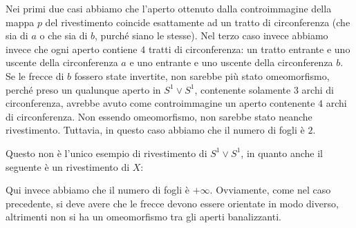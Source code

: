 \documentclass[11pt, a4paper, twoside]{article}
\begin{document}
\begin{es}[$X=S^1 \vee S^1$]
\begin{itemize}
	\end{itemize}
	Nei primi due casi abbiamo che l'aperto ottenuto dalla controimmagine della mappa $p$ del rivestimento coincide esattamente ad un tratto di circonferenza (che sia di $a$ o che sia di $b$, purché siano le stesse). Nel terzo caso invece abbiamo invece che ogni aperto contiene $4$ tratti di circonferenza: un tratto entrante e uno uscente della circonferenza $a$ e uno entrante e uno uscente della circonferenza $b$. Se le frecce di $b$ fossero state invertite, non sarebbe più stato omeomorfismo, perché preso un qualunque aperto in $S^1\vee S^1$, contenente solamente $3$ archi di circonferenza, avrebbe avuto come controimmagine un aperto contenente $4$ archi di circonferenza. Non essendo omeomorfismo, non sarebbe stato neanche rivestimento. Tuttavia, in questo caso abbiamo che il numero di fogli è $2$.

	Questo non è l'unico esempio di rivestimento di $S^1 \vee S^1$, in quanto anche il seguente è un rivestimento di $X$:
	\begin{center}
	\end{center}
	Qui invece abbiamo che il numero di fogli è $+\infty$. Ovviamente, come nel caso precedente, si deve avere che le frecce devono essere orientate in modo diverso, altrimenti non si ha un omeomorfismo tra gli aperti banalizzanti.


\end{es}
\end{document}
